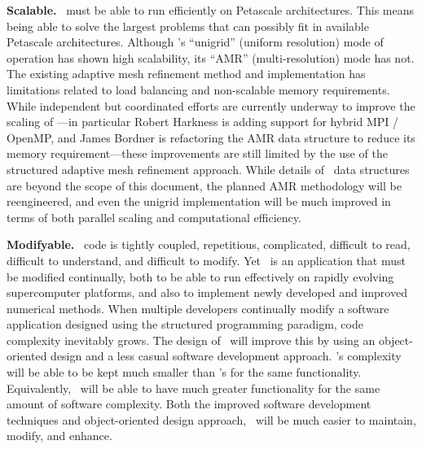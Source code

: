 \documentclass[11pt]{article}
\begin{document}

    \textbf{Scalable.} \cello\ must be able to run efficiently on
    Petascale architectures.  This means being able to solve the
    largest problems that can possibly fit in available Petascale
    architectures.  Although \enzo's ``unigrid'' (uniform resolution)
    mode of operation has shown high scalability, its ``AMR''
    (multi-resolution) mode has not.  The existing adaptive mesh
    refinement method and implementation has limitations related to
    load balancing and non-scalable memory requirements.  While
    independent but coordinated efforts are currently underway to
    improve the scaling of \enzo---in particular Robert Harkness is
    adding support for hybrid MPI / OpenMP, and James Bordner is
    refactoring the AMR data structure to reduce its memory
    requirement---these improvements are still limited by the use of
    the structured adaptive mesh refinement approach.  While details
    of \cello\ data structures are beyond the scope of this document,
    the planned AMR methodology will be reengineered, and even the
    unigrid implementation will be much improved in terms of both
    parallel scaling and computational efficiency.


    \textbf{Modifyable.} \enzo\ code is tightly coupled, repetitious,
    complicated, difficult to read, difficult to understand, and
    difficult to modify.  Yet \enzo\ is an application that must be
    modified continually, both to be able to run effectively on
    rapidly evolving supercomputer platforms, and also to implement
    newly developed and improved numerical methods.  When multiple
    developers continually modify a software application designed
    using the structured programming paradigm, code complexity
    inevitably grows.  The design of \cello\ will improve this by
    using an object-oriented design and a less casual software
    development approach.  \cello's complexity will be able to be kept
    much smaller than \enzo's for the same functionality.
    Equivalently, \cello\ will be able to have much greater
    functionality for the same amount of software complexity.  Both
    the improved software development techniques and object-oriented design
    approach, \cello\ will be much easier to maintain, modify, and enhance.

\end{document}
